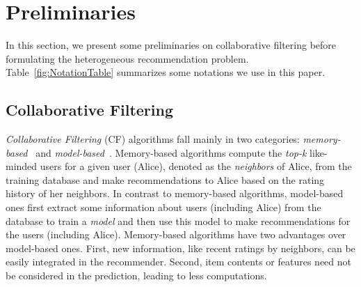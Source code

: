 \vspace{-2mm}
\section{Preliminaries}
\label{background}
In this section, we present some preliminaries on collaborative filtering before formulating the heterogeneous recommendation problem.
Table~\ref{fig:NotationTable} summarizes some notations we use in this paper.

\vspace{-1mm}
\subsection{Collaborative Filtering}

\emph{Collaborative Filtering} (CF) algorithms fall mainly in two categories: \emph{memory-based}~\cite{breese1998empirical,resnick1994grouplens, soboroff2000collaborative} and \emph{model-based}~\cite{hofmann1999latent, kohrs1999clustering, ungar1998clustering}. Memory-based algorithms compute the \emph{top-k} like-minded users for a given user (Alice), denoted as the \emph{neighbors} of Alice, from the training database and make recommendations to Alice based on the rating history of her neighbors. In contrast to memory-based algorithms, model-based ones first extract some information about users (including Alice) from the database to train a \emph{model} and then use this model to make recommendations for the users (including Alice).
Memory-based algorithms have two advantages over model-based ones. First, new information, like recent ratings by neighbors, can be easily integrated in the recommender. Second, item contents or features need not be considered in the prediction, leading to less computations.


